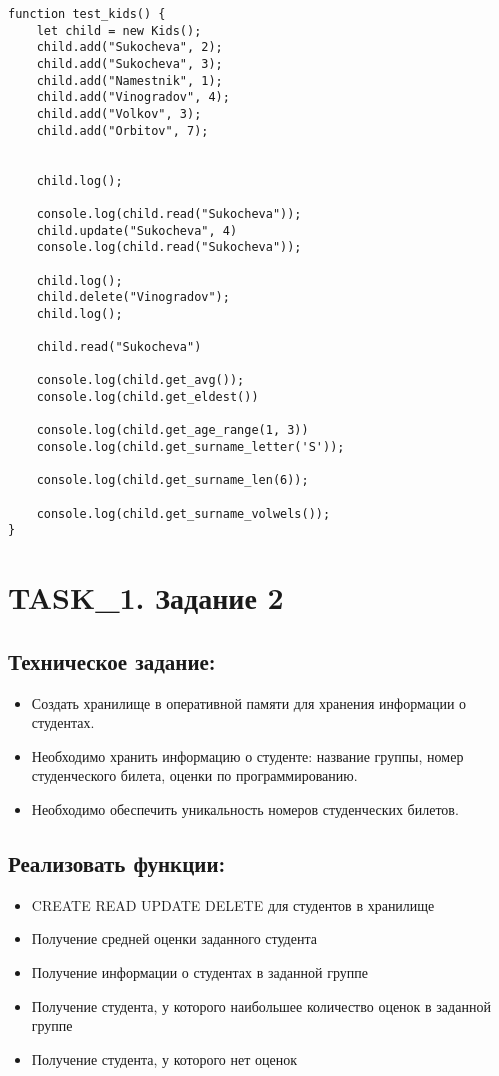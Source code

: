 \begin{lstlisting}[caption=Код тестов. Задание 1.]
function test_kids() {
	let child = new Kids();
	child.add("Sukocheva", 2);
	child.add("Sukocheva", 3);
	child.add("Namestnik", 1);
	child.add("Vinogradov", 4);
	child.add("Volkov", 3);
	child.add("Orbitov", 7);


	child.log();

	console.log(child.read("Sukocheva"));
	child.update("Sukocheva", 4)
	console.log(child.read("Sukocheva"));

	child.log();
	child.delete("Vinogradov");
	child.log();

	child.read("Sukocheva")

	console.log(child.get_avg());
	console.log(child.get_eldest())

	console.log(child.get_age_range(1, 3))
	console.log(child.get_surname_letter('S'));

	console.log(child.get_surname_len(6));

	console.log(child.get_surname_volwels());
}
\end{lstlisting}


\chapter{TASK\_1. Задание 2}

\section{Техническое задание:}

\begin{itemize}
	\item Создать хранилище в оперативной памяти для хранения информации о студентах.
	\item Необходимо хранить информацию о студенте: название группы, номер студенческого билета, оценки по программированию.
	\item Необходимо обеспечить уникальность номеров студенческих билетов.
\end{itemize}

\section{Реализовать функции:}

\begin{itemize}
	\item CREATE READ UPDATE DELETE для студентов в хранилище
	\item Получение средней оценки заданного студента
	\item Получение информации о студентах в заданной группе
	\item Получение студента, у которого наибольшее количество оценок в заданной группе
	\item Получение студента, у которого нет оценок
\end{itemize}

